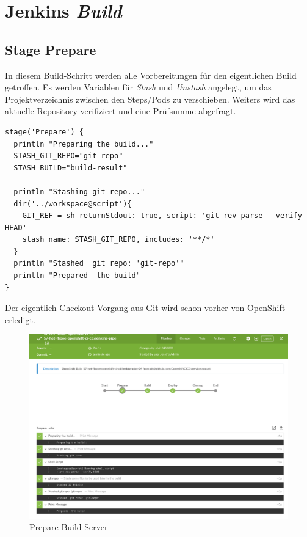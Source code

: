\section{Jenkins \emph{Build}}
\label{sec:jenkins-build}

\subsection{Stage Prepare}

In diesem Build-Schritt werden alle Vorbereitungen für den eigentlichen Build getroffen. Es werden Variablen für \emph{Stash} und \emph{Unstash} angelegt, um das Projektverzeichnis zwischen den Steps/Pods zu verschieben. Weiters wird das aktuelle Repository verifiziert und eine Prüfsumme abgefragt.

\begin{verbatim}
stage('Prepare') {
  println "Preparing the build..."
  STASH_GIT_REPO="git-repo"
  STASH_BUILD="build-result"

  println "Stashing git repo..."
  dir('../workspace@script'){
    GIT_REF = sh returnStdout: true, script: 'git rev-parse --verify HEAD'
    stash name: STASH_GIT_REPO, includes: '**/*'
  }
  println "Stashed  git repo: 'git-repo'"
  println "Prepared  the build"
}
\end{verbatim}

Der eigentlich Checkout-Vorgang aus Git wird schon vorher von OpenShift erledigt.

\begin{figure}[H]
	\centering
	\includegraphics[scale=0.4]{image/jenkins-prepare.png}
	\caption{Prepare Build Server}
	\label{fig:architecture}
\end{figure}


